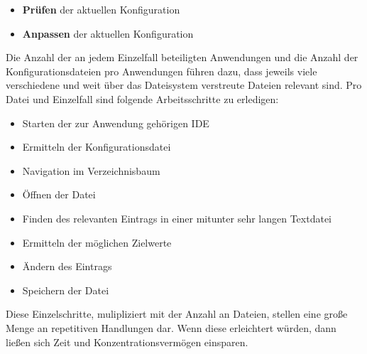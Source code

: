 \begin{itemize}
    \item \textbf{Prüfen} der aktuellen Konfiguration
    \item \textbf{Anpassen} der aktuellen Konfiguration
\end{itemize}

Die Anzahl der an jedem Einzelfall beteiligten Anwendungen und die Anzahl der
Konfigurationsdateien pro Anwendungen führen dazu, dass jeweils viele verschiedene
und weit über das Dateisystem verstreute Dateien relevant sind. Pro Datei und
Einzelfall sind folgende Arbeitsschritte zu erledigen:

\begin{itemize}
    \item Starten der zur Anwendung gehörigen \gls{IDE}
    \item Ermitteln der Konfigurationsdatei
    \item Navigation im Verzeichnisbaum
    \item Öffnen der Datei
    \item Finden des relevanten Eintrags in einer mitunter sehr langen Textdatei
    \item Ermitteln der möglichen Zielwerte
    \item Ändern des Eintrags
    \item Speichern der Datei
\end{itemize}

Diese Einzelschritte, mulipliziert mit der Anzahl an Dateien, stellen eine
große Menge an repetitiven Handlungen dar. Wenn diese erleichtert würden, dann
ließen sich Zeit und Konzentrationsvermögen einsparen.
